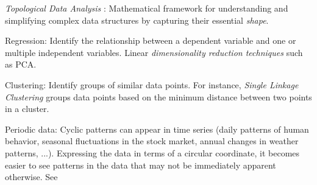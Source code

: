 \documentclass[11pt, a4paper]{amsart}
\begin{document}
\emph{Topological Data Analysis} \cite{carlsson2022topologicaldataanalysis}:
Mathematical framework for understanding and simplifying complex data structures by capturing their essential \emph{shape}.

Regression:
Identify the relationship between a dependent variable and one or multiple independent variables.
Linear \emph{dimensionality reduction techniques} such as PCA.

Clustering:
Identify groups of similar data points.
For instance, \emph{Single Linkage Clustering} groups data points based on the minimum distance between two points in a cluster.

Periodic data:
Cyclic patterns can appear in time series (daily patterns of human behavior, seasonal fluctuations in the stock market, annual changes in weather patterns, ...).
Expressing the data in terms of a circular coordinate, it becomes easier to see patterns in the data that may not be immediately apparent otherwise.
See 
\end{document}
